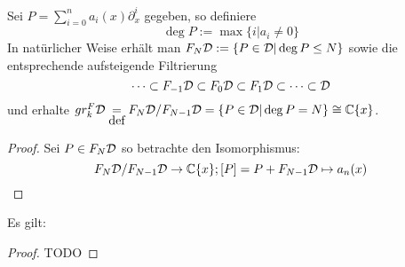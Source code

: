 \begin{defn}
  Sei $P=\sum_{i=0}^na_i(x)\partial_x^i$ gegeben, so definiere 
  \[
    \deg P:=\max\{i|a_i\neq 0\}
  \]
  In natürlicher Weise erhält man $F_N\mathcal{D}:=\{P\in\mathcal{D}|\deg P\leq N\}$ sowie die
  entsprechende aufsteigende Filtrierung
  \[
    \cdots\subset F_{-1}\mathcal{D}\subset F_{0}\mathcal{D}\subset
    F_{1}\mathcal{D}\subset\cdots\subset\mathcal{D}
  \]
  und erhalte $gr_k^F\mathcal{D}\underset{\mbox{def}}{=}F_N\mathcal{D}\slash F_{N-1}\mathcal{D}
  =\{P\in\mathcal{D}|\deg P=N\}\cong\mathbb{C}\{x\}$.
\end{defn}

\begin{proof}
  Sei $P\in F_N\mathcal{D}$ so betrachte den Isomorphismus:
  \[
    F_N\mathcal{D}\slash F_{N-1}\mathcal{D}\rightarrow \mathbb{C}\{x\}; [P]=P+F_{N-1}\mathcal{D}\mapsto a_n(x)
  \]
\end{proof}

\begin{prop}
  Es gilt:
  \begin{center}
  \end{center}
\end{prop}
\begin{proof} TODO
  \begin{comment}
    Treffen?
  \end{comment}
\end{proof}

\begin{comment}
  \subsection{Weyl Algebra als Graduierter Ring}
  Sei $A$ nun einer der drei Koeffizienten Ringe, welche zuvor behandelt
  wurden.  Der Ring $A<\partial_x>$ kommt zusammen mit einer aufsteigenden
  Filtrierung, welche wir mit $F(A<\partial_x)$ bezeichen werden.  Sei $P$ ein
  bzgl. \ref{prop:weyl_eindeutige_schreibung} minimal geschriebener Operator,
  so ist $P$ in $F_k$ falls der maximale Grad von $\partial_x$ in $P$ kleiner
  oder gleich $k$. So definiere den Grad $deg P$ von $P$ als die Eindeutige
  ganze Zahl $k$ mit $P\in F_kA<\partial_x>\slash F_{k-1}<\partial_x>$

  Unabhängigkeit von Schreibung wird in Sabbah Script behauptet
\end{comment}

